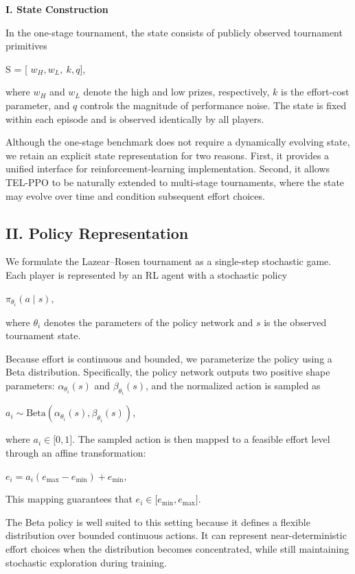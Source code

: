 \documentclass[
]{article}
\begin{document}
\textbf{I. State Construction}

In the one-stage tournament, the state consists of publicly observed
tournament primitives

S = {[} \(w_{H},w_{L},\ k,q\){]},

where \(w_{H}\) and \(w_{L}\) denote the high and low prizes,
respectively, \(k\) is the effort-cost parameter, and \(q\) controls the
magnitude of performance noise. The state is fixed within each episode
and is observed identically by all players.

Although the one-stage benchmark does not require a dynamically evolving
state, we retain an explicit state representation for two reasons.
First, it provides a unified interface for reinforcement-learning
implementation. Second, it allows TEL-PPO to be naturally extended to
multi-stage tournaments, where the state may evolve over time and
condition subsequent effort choices.

\subsection{\texorpdfstring{\textbf{II. Policy
Representation}}{II. Policy Representation}}\label{ii.-policy-representation}

We formulate the Lazear--Rosen tournament as a single-step stochastic
game. Each player is represented by an RL agent with a stochastic policy

\(\pi_{\theta_{i}}\left( a\mid s \right)\),

where \(\theta_{i}\) denotes the parameters of the policy network and
\(s\) is the observed tournament state.

Because effort is continuous and bounded, we parameterize the policy
using a Beta distribution. Specifically, the policy network outputs two
positive shape parameters: \(\alpha_{\theta_{i}}(s)\) and
\(\beta_{\theta_{i}}(s)\), and the normalized action is sampled as

\(a_{i} \sim \text{Beta}(\alpha_{\theta_{i}}(s),\beta_{\theta_{i}}(s))\),

where \(a_{i} \in \lbrack 0,1\rbrack\). The sampled action is then
mapped to a feasible effort level through an affine transformation:

\(e_{i} = a_{i}(e_{\max} - e_{\min}) + e_{\min}\),

This mapping guarantees that
\(e_{i} \in \lbrack e_{\min},e_{\max}\rbrack\).

The Beta policy is well suited to this setting because it defines a
flexible distribution over bounded continuous actions. It can represent
near-deterministic effort choices when the distribution becomes
concentrated, while still maintaining stochastic exploration during
training.
\end{document}
